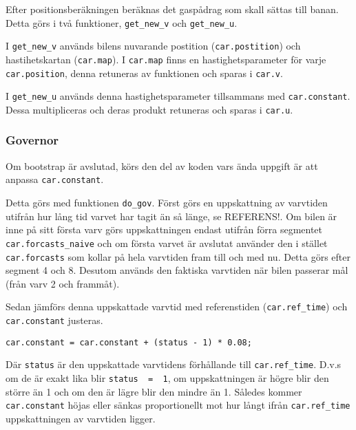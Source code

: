 Efter positionsberäkningen beräknas det gaspådrag som skall sättas till banan. Detta görs i två
funktioner, \texttt{get\_new\_v} och \texttt{get\_new\_u}.
 
I \texttt{get\_new\_v} används bilens nuvarande postition (\texttt{car.postition})
och hastihetskartan (\texttt{car.map}). I \texttt{car.map} finns en
hastighetsparameter för varje \texttt{car.position}, denna retuneras av funktionen
och sparas i \texttt{car.v}.
 
I \texttt{get\_new\_u} används denna hastighetsparameter tillsammans med
\texttt{car.constant}. Dessa multipliceras och deras produkt retuneras och sparas
i \texttt{car.u}.

\subsubsection{Governor}

Om bootstrap är avslutad, körs den del av koden vars ända uppgift är att 
anpassa \texttt{car.constant}. 

Detta görs med funktionen \texttt{do\_gov}.  Först görs en uppskattning av 
varvtiden utifrån hur lång tid varvet har tagit än
så länge, se REFERENS!. Om bilen är inne på sitt första varv görs uppskattningen endast
utifrån förra segmentet \texttt{car.forcasts\_naive} och om första varvet är
avslutat använder den i stället \texttt{car.forcasts} som kollar på hela varvtiden
fram till och med nu. Detta görs efter segment 4 och 8. Desutom används den
faktiska varvtiden när bilen passerar mål (från varv 2 och frammåt).
 
Sedan jämförs denna uppskattade varvtid med referenstiden (\texttt{car.ref\_time}) 
och \texttt{car.constant} justeras.
\begin{verbatim}
car.constant = car.constant + (status - 1) * 0.08;
\end{verbatim}
Där \texttt{status} är den uppskattade varvtidens förhållande till \texttt{car.ref\_time}.
D.v.s om de är exakt lika blir \texttt{status~ =~ 1}, om uppskattningen är högre blir
den större än 1 och om den är lägre blir den mindre än 1. Således kommer \texttt{car.constant}
höjas eller sänkas proportionellt mot hur långt ifrån \texttt{car.ref\_time} uppskattningen
av varvtiden ligger. 
